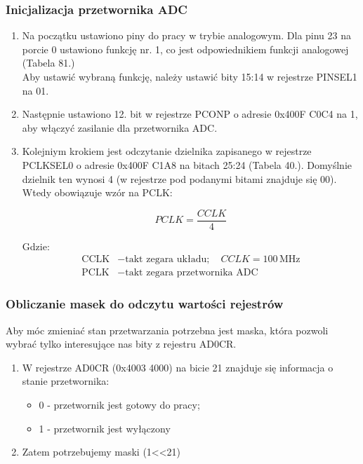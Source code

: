 \subsubsection{Inicjalizacja przetwornika ADC}
    \begin{enumerate}
        \item Na początku ustawiono piny do pracy w trybie analogowym. Dla pinu 23 na porcie 0 ustawiono funkcję nr. 1, co jest odpowiednikiem funkcji analogowej (Tabela 81.) \\%
              Aby ustawić wybraną funkcję, należy ustawić bity 15:14 w rejestrze PINSEL1 na 01.
        \item Następnie ustawiono 12. bit w rejestrze PCONP o adresie 0x400F C0C4 na 1, aby włączyć zasilanie dla przetwornika ADC.
        \item Kolejniym krokiem jest odczytanie dzielnika zapisanego w rejestrze PCLKSEL0 o adresie 0x400F C1A8 na bitach 25:24 (Tabela 40.). Domyślnie dzielnik ten wynosi 4 (w rejestrze pod podanymi bitami znajduje się 00). Wtedy obowiązuje wzór na PCLK:
        
        \begin{equation*}
            PCLK = \frac{CCLK}{4}
        \end{equation*}
            
        Gdzie:
        \begin{align*}
        \text{CCLK} & - \text{takt zegara układu};\quad CCLK = 100\,\text{MHz} \\
        \text{PCLK} & - \text{takt zegara przetwornika ADC}
        \end{align*}
    \end{enumerate}

\subsubsection{Obliczanie masek do odczytu wartości rejestrów}
        Aby móc zmieniać stan przetwarzania potrzebna jest maska, która pozwoli wybrać tylko interesujące nas bity z rejestru AD0CR.
        \begin{enumerate}
            \item W rejestrze AD0CR (0x4003 4000) na bicie 21 znajduje się informacja o stanie przetwornika:
            \begin{itemize}
                \item 0 - przetwornik jest gotowy do pracy;
                \item 1 - przetwornik jest wyłączony
            \end{itemize}
            \item Zatem potrzebujemy maski (1<<21)
        \end{enumerate}
